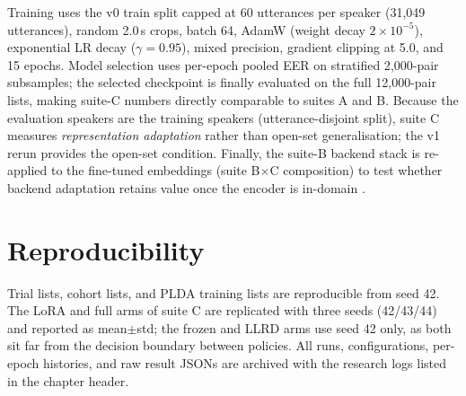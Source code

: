 Training uses the v0 train split capped at 60 utterances per speaker
(31{,}049 utterances), random 2.0\,s crops, batch 64, AdamW (weight
decay $2{\times}10^{-5}$), exponential LR decay ($\gamma{=}0.95$),
mixed precision, gradient clipping at 5.0, and 15 epochs. Model
selection uses per-epoch pooled EER on stratified 2{,}000-pair
subsamples; the selected checkpoint is finally evaluated on the full
12{,}000-pair lists, making suite-C numbers directly comparable to
suites A and B. Because the evaluation speakers are the training
speakers (utterance-disjoint split), suite C measures
\emph{representation adaptation} rather than open-set
generalisation; the v1 rerun provides the open-set condition.
Finally, the suite-B backend stack is re-applied to the fine-tuned
embeddings (suite B$\times$C composition) to test whether backend
adaptation retains value once the encoder is in-domain
\cite{wang2022plda}.

\section{Reproducibility}
\label{ssec:repro}

Trial lists, cohort lists, and PLDA training lists are reproducible
from seed 42. The LoRA and full arms of suite C are replicated with
three seeds (42/43/44) and reported as mean$\pm$std; the frozen and
LLRD arms use seed 42 only, as both sit far from the decision
boundary between policies. All runs, configurations, per-epoch
histories, and raw result JSONs are archived with the research logs
listed in the chapter header.
